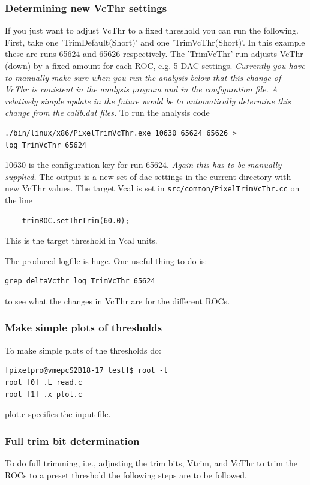 \subsubsection{Determining new VcThr settings}

If you just want to adjust VcThr to a fixed threshold you can run the following. First, take one 'TrimDefault(Short)' and one 'TrimVcThr(Short)'. In this example these are  runs 65624 and 65626 respectively. The 'TrimVcThr' run  adjusts VcThr (down) by a fixed amount for each ROC, e.g. 5 DAC settings. {\it Currently you have to manually make sure when you run the analysis below that this change of VcThr is conistent in the analysis program and in the configuration file. A relatively simple update in the future would be to automatically determine this change from the calib.dat files.} 
To run the analysis code 
\begin{verbatim}
./bin/linux/x86/PixelTrimVcThr.exe 10630 65624 65626 > log_TrimVcThr_65624
\end{verbatim}

10630 is the configuration key for run 65624. {\it Again this has to be manually supplied.} The output is a new set of dac settings in the current directory with new VcThr values. The target Vcal is set in {\tt src/common/PixelTrimVcThr.cc} on the line
\begin{verbatim}
    trimROC.setThrTrim(60.0);
\end{verbatim}
This is the target threshold in Vcal units.

The produced logfile is huge. One useful thing to do is:
\begin{verbatim}
grep deltaVcthr log_TrimVcThr_65624
\end{verbatim}
to see what the changes in VcThr are for the different ROCs.

\subsubsection{Make simple plots of thresholds}

To make simple plots of the thresholds do:

\begin{verbatim}
[pixelpro@vmepcS2B18-17 test]$ root -l
root [0] .L read.c
root [1] .x plot.c  
\end{verbatim}

plot.c specifies the input file.

\subsubsection{Full trim bit determination}
\label{sec:trimmingShort}
To do full trimming, i.e., adjusting the trim bits, Vtrim, and VcThr to trim the ROCs to a preset threshold the following steps are to be followed.

